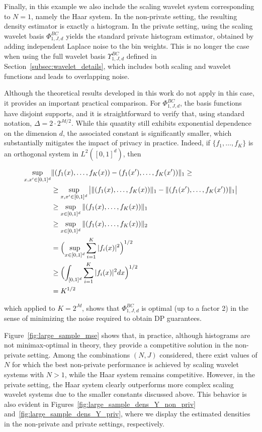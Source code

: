 \documentclass{article}
\newcommand{\1}{\mathds{1}}
\theoremstyle{plain}
\theoremstyle{definition}
\theoremstyle{remark}
\begin{document}
Finally, in this example we also include the scaling wavelet system corresponding to $N = 1$, namely the Haar system. In the non-private setting, the resulting density estimator is exactly a histogram. In the private setting, using the scaling wavelet basis $\Phi_{1,J,d}^{BC}$ yields the standard private histogram estimator, obtained by adding independent Laplace noise to the bin weights. This is no longer the case when using the full wavelet basis $\Upsilon_{1,J,d}^{BC}$ defined in Section~\ref{subsec:wavelet_details}, which includes both scaling and wavelet functions and leads to overlapping noise.

Although the theoretical results developed in this work do not apply in this case, it provides an important practical comparison. For $\Phi_{1,J,d}^{BC}$, the basis functions have disjoint supports, and it is straightforward to verify that, using standard notation,
\(
\Delta = 2 \cdot 2^{Jd/2}.
\)
While this quantity still exhibits exponential dependence on the dimension $d$, the associated constant is significantly smaller, which substantially mitigates the impact of privacy in practice. Indeed, if $\{ f_1,\ldots,f_{K}\}$ is an orthogonal system in $L^2([0,1]^d)$, then

\begin{align}
    \sup_{x,x'\in [0,1]^d} &\| (f_1(x),\ldots, f_K(x))-(f_1(x'),\ldots, f_K(x')) \|_1 \geq \\
    & \geq \sup_{x,x'\in [0,1]^d} \big| \| (f_1(x),\ldots, f_K(x))\|_1 -\|(f_1(x'),\ldots, f_K(x')) \|_1 \big|\\
    & \geq \sup_{x\in [0,1]^d}  \| (f_1(x),\ldots, f_K(x))\|_1 \\
    & \geq \sup_{x\in [0,1]^d}  \| (f_1(x),\ldots, f_K(x))\|_2 \\
    & = \Bigl( \sup_{x\in [0,1]^d}  \sum_{i=1}^K |f_i(x)|^2 \Bigr)^{1/2} \\
    & \geq  \Bigl(     \int_{[0,1]^d} \sum_{i=1}^K |f_i(x)|^2  dx \Bigr)^{1/2}\\
    & = K^{1/2}
\end{align}

which applied to $K=2^{Jd}$, shows that $\Phi_{1,J,d}^{BC}$ is optimal (up to a factor 2) in the sense of minimizing the noise required to obtain DP guarantees.

Figure~\ref{fig:large_sample_mse} shows that, in practice, although histograms are not minimax-optimal in theory, they provide a competitive solution in the non-private setting. Among the combinations $(N,J)$ considered, there exist values of $N$ for which the best non-private performance is achieved by scaling wavelet systems with $N > 1$, while the Haar system remains competitive. However, in the private setting, the Haar system clearly outperforms more complex scaling wavelet systems due to the smaller constants discussed above. This behavior is also evident in Figures~\ref{fig:large_sample_dens_Y_non_priv} and~\ref{fig:large_sample_dens_Y_priv}, where we display the estimated densities in the non-private and private settings, respectively.
\end{document}
